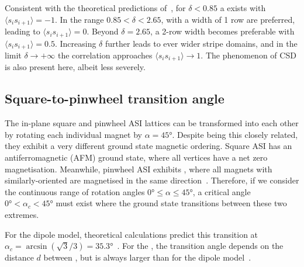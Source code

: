 Consistent with the theoretical predictions of~, for $\delta < 0.85$ a  exists with $\langle s_i s_{i+1} \rangle = -1$.
In the range $0.85 < \delta < 2.65$,  with a width of 1 row are preferred, leading to $\langle s_i s_{i+1} \rangle = 0$.
Beyond $\delta=2.65$, a 2-row width becomes preferable with $\langle s_i s_{i+1} \rangle = 0.5$.
Increasing $\delta$ further leads to ever wider stripe domains, and in the limit $\delta \rightarrow +\infty$ the correlation approaches $\langle s_i s_{i+1} \rangle \rightarrow 1$.
The phenomenon of CSD is also present here, albeit less severely.

\subsection{Square-to-pinwheel transition angle}\label{sec:2:Verification_IP_SquarePinwheel}
The in-plane square and pinwheel ASI lattices can be transformed into each other by rotating each individual magnet by $\alpha = \ang{45}$.
Despite being this closely related, they exhibit a very different ground state magnetic ordering.
Square ASI has an antiferromagnetic (AFM) ground state, where all vertices have a net zero magnetisation.
Meanwhile, pinwheel ASI exhibits , where all magnets with similarly-oriented  are magnetised in the same direction~\cite{ApparentFMpinwheel}.
Therefore, if we consider the continuous range of rotation angles $\ang{0} \leq \alpha \leq \ang{45}$, a critical angle $\ang{0} < \alpha_c < \ang{45}$ must exist where the ground state transitions between these two extremes. \par
For the dipole model, theoretical calculations predict this transition at $\alpha_c = \arcsin(\sqrt{3}/3) = \ang{35.3}$~\cite{AFM-FM-transition-Pinwheel,MagicAngle}.
For the , the transition angle depends on the distance $d$ between , but is always larger than for the dipole model~\cite{AFM-FM-transition-Pinwheel}.


